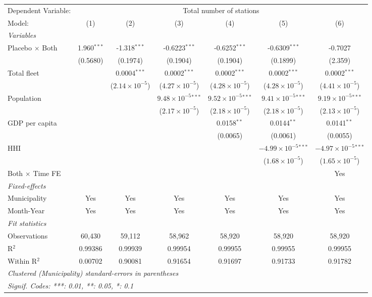 \documentclass[
]{article}
\begin{document}
\begin{tabular}{lcccccc}
\tabularnewline\midrule\midrule
Dependent Variable:&\multicolumn{6}{c}{Total number of stations}\\
Model:&(1) & (2) & (3) & (4) & (5) & (6)\\
\midrule \emph{Variables}&   &   &   &   &   &  \\
Placebo $\times $ Both & 1.960$^{***}$ & -1.318$^{***}$ & -0.6223$^{***}$ & -0.6252$^{***}$ & -0.6309$^{***}$ & -0.7027\\
  &(0.5680) & (0.1974) & (0.1904) & (0.1904) & (0.1899) & (2.359)\\
Total fleet &    & 0.0004$^{***}$ & 0.0002$^{***}$ & 0.0002$^{***}$ & 0.0002$^{***}$ & 0.0002$^{***}$\\
  &   & ($2.14\times 10^{-5}$) & ($4.27\times 10^{-5}$) & ($4.28\times 10^{-5}$) & ($4.28\times 10^{-5}$) & ($4.41\times 10^{-5}$)\\
Population &    &    & $9.48\times 10^{-5}$$^{***}$ & $9.52\times 10^{-5}$$^{***}$ & $9.41\times 10^{-5}$$^{***}$ & $9.19\times 10^{-5}$$^{***}$\\
  &   &    & ($2.17\times 10^{-5}$) & ($2.18\times 10^{-5}$) & ($2.18\times 10^{-5}$) & ($2.13\times 10^{-5}$)\\
GDP per capita &    &    &    & 0.0158$^{**}$ & 0.0144$^{**}$ & 0.0141$^{**}$\\
  &   &    &    & (0.0065) & (0.0061) & (0.0055)\\
HHI &    &    &    &    & $-4.99\times 10^{-5}$$^{***}$ & $-4.97\times 10^{-5}$$^{***}$\\
  &   &    &    &    & ($1.68\times 10^{-5}$) & ($1.65\times 10^{-5}$)\\
Both $\times$ Time FE &  &  &  &  &  & Yes\\
\midrule \emph{Fixed-effects}&   &   &   &   &   &  \\
Municipality & Yes & Yes & Yes & Yes & Yes & Yes\\
Month-Year & Yes & Yes & Yes & Yes & Yes & Yes\\
\midrule \emph{Fit statistics}&  & & & & & \\
Observations & 60,430&59,112&58,962&58,920&58,920&58,920\\
R$^2$ & 0.99386&0.99939&0.99954&0.99955&0.99955&0.99955\\
Within R$^2$ & 0.00702&0.90081&0.91654&0.91697&0.91733&0.91782\\
\midrule\midrule\multicolumn{7}{l}{\emph{Clustered (Municipality) standard-errors in parentheses}}\\
\multicolumn{7}{l}{\emph{Signif. Codes: ***: 0.01, **: 0.05, *: 0.1}}\\
\end{tabular}
\end{document}
